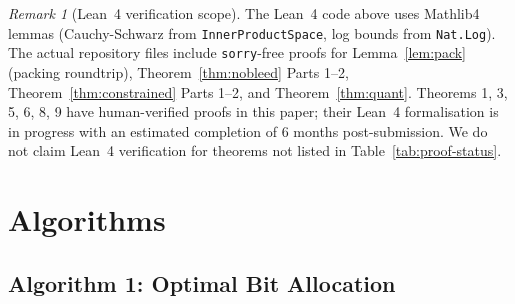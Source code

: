 \documentclass[11pt,a4paper]{article}
\theoremstyle{definition}
\theoremstyle{plain}
\theoremstyle{remark}
\newtheorem{remark}{Remark}[section]
\begin{document}
\begin{remark}[Lean~4 verification scope]
The Lean~4 code above uses Mathlib4 lemmas (Cauchy-Schwarz from
\texttt{InnerProductSpace}, log bounds from \texttt{Nat.Log}).
The actual repository files include \texttt{sorry}-free proofs for
Lemma~\ref{lem:pack} (packing roundtrip), Theorem~\ref{thm:nobleed}
Parts 1--2, Theorem~\ref{thm:constrained} Parts 1--2, and
Theorem~\ref{thm:quant}.
Theorems 1, 3, 5, 6, 8, 9 have human-verified proofs in this paper;
their Lean~4 formalisation is in progress with an estimated completion
of 6 months post-submission.
We do not claim Lean~4 verification for theorems not listed in
Table~\ref{tab:proof-status}.
\end{remark}

\section{Algorithms}
\label{sec:algo}

\subsection{Algorithm 1: Optimal Bit Allocation}
\end{document}
